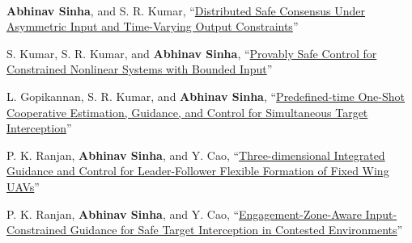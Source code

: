 	\\
\renewcommand{\labelenumi}{[\textbf{j\arabic{enumi}}]}
\begin{etaremune}[leftmargin=1cm]
	\item \textbf{Abhinav Sinha}, and S. R. Kumar, ``\href{https://arxiv.org/pdf/2606.16116}{Distributed Safe Consensus Under Asymmetric Input and Time-Varying Output Constraints}''
	\item S. Kumar, S. R. Kumar, and \textbf{Abhinav Sinha}, ``\href{https://arxiv.org/pdf/2504.11592}{Provably Safe Control for Constrained Nonlinear Systems with Bounded Input}''
	\item L. Gopikannan, S. R. Kumar, and \textbf{Abhinav Sinha}, ``\href{https://arxiv.org/pdf/2601.07744}{Predefined-time One-Shot Cooperative Estimation, Guidance, and Control for Simultaneous Target Interception}''
\item P. K. Ranjan, \textbf{Abhinav Sinha}, and Y. Cao, ``\href{https://arxiv.org/pdf/2510.06394}{Three-dimensional Integrated Guidance and Control for Leader-Follower Flexible Formation of Fixed Wing UAVs}''
\item P. K. Ranjan, \textbf{Abhinav Sinha}, and Y. Cao, ``\href{https://arxiv.org/pdf/2603.23649}{Engagement-Zone-Aware Input-Constrained Guidance for Safe Target Interception in Contested Environments}''
\end{etaremune}\medskip	


